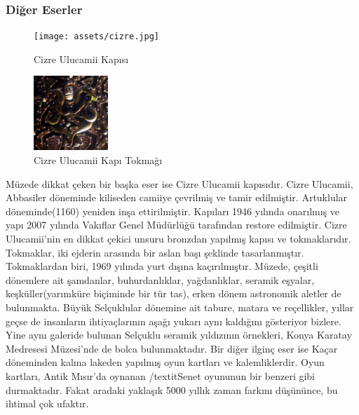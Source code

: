 \subsubsection{Diğer Eserler}
\begin{figure}
    \texttt{[image: assets/cizre.jpg]}
    \caption{Cizre Ulucamii Kapısı}
    \label{fig:cizre}
    \vspace{10pt}
    \includegraphics[width=0.25\textwidth]{assets/tokmak.jpg}
    \caption{Cizre Ulucamii Kapı Tokmağı}
    \label{fig:tokmak}
\end{figure}
\indent\indent Müzede dikkat çeken bir başka eser ise Cizre Ulucamii kapısıdır. Cizre Ulucamii, Abbasiler döneminde kiliseden camiiye çevrilmiş ve tamir edilmiştir. Artuklular döneminde(1160) yeniden inşa ettirilmiştir. Kapıları 1946 yılında onarılmış ve yapı 2007 yılında Vakıflar Genel Müdürlüğü tarafından restore edilmiştir. Cizre Ulucamii'nin en dikkat çekici unsuru bronzdan yapılmış kapısı ve tokmaklarıdır. Tokmaklar, iki ejderin arasında bir aslan başı şeklinde tasarlanmıştır. Tokmaklardan biri, 1969 yılında yurt dışına kaçırılmıştır.\cite{dia_5}\newline
\indent Müzede, çeşitli dönemlere ait şamdanlar, buhurdanlıklar, yağdanlıklar, seramik eşyalar, keşküller(yarımküre biçiminde bir tür tas), erken dönem astronomik aletler de bulunmakta. Büyük Selçuklular dönemine ait tabure, matara ve reçellikler, yıllar geçse de insanların ihtiyaçlarının aşağı yukarı aynı kaldığını gösteriyor bizlere. Yine aynı galeride bulunan Selçuklu seramik yıldızının örnekleri, Konya Karatay Medresesi Müzesi'nde de bolca bulunmaktadır. Bir diğer ilginç eser ise Kaçar döneminden kalma lakeden yapılmış oyun kartları ve kalemliklerdir. Oyun kartları, Antik Mısır'da oynanan /textit{Senet} oyununun bir benzeri gibi durmaktadır. Fakat aradaki yaklaşık 5000 yıllık zaman farkını düşününce, bu ihtimal çok ufaktır.
\newpage
\clearpage
